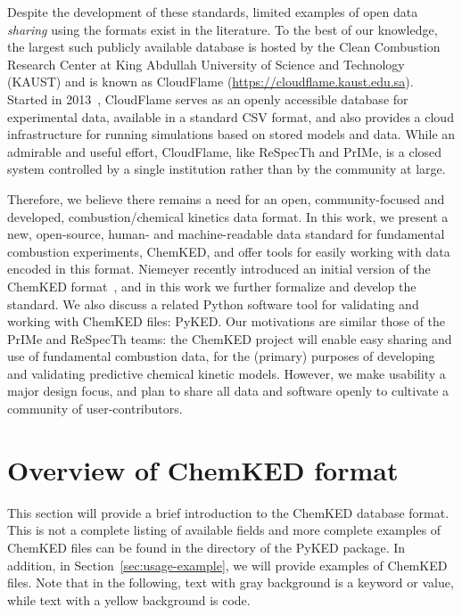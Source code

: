\documentclass[12pt]{ussci}
\newcommand\ck{ChemKED}
\newcommand\pk{PyKED}
\begin{document}
Despite the development of these standards, limited examples of open data
\emph{sharing} using the formats exist in the literature. To the best
of our knowledge, the largest such publicly available database is hosted by
the Clean Combustion Research Center at King Abdullah University of Science and
Technology (KAUST) and is known as CloudFlame
(\url{https://cloudflame.kaust.edu.sa}). Started in
2013~\autocite{Goteng:2013cf}, CloudFlame serves
as an openly accessible database for experimental data, available in a standard
CSV format, and also provides a cloud infrastructure for running simulations
based on stored models and data. While an admirable and useful effort,
CloudFlame, like ReSpecTh and PrIMe, is a closed system controlled by a single
institution rather than by the community at large.

Therefore, we believe there remains a need for an open, community-focused and
developed, combustion\slash chemical kinetics data format. In this work, we
present a new, open-source, human- and machine-readable data standard for
fundamental combustion experiments, \ck{}, and offer tools for easily working
with data encoded in this format. Niemeyer recently introduced an initial
version of the \ck{} format~\autocite{Niemeyer:2016wf}, and in this work we
further formalize and develop the standard. We also discuss a related Python
software tool for validating and working with \ck{} files: \pk{}. Our
motivations are similar those of the PrIMe and ReSpecTh teams: the \ck{} project
will enable easy sharing and use of fundamental combustion data, for the
(primary) purposes of developing and validating predictive chemical kinetic
models. However, we make usability a major design focus, and plan to share all
data and software openly to cultivate a community of user-contributors.

\section{Overview of ChemKED format}\label{sec:overview-of-format}

This section will provide a brief introduction to the \ck{} database format.
This is not a complete listing of available fields and more complete examples of
\ck{} files can be found in the  directory of the \pk{} package. In
addition, in Section~\ref{sec:usage-example}, we will provide examples of \ck{}
files. Note that in the following, text with gray background is a 
keyword or value, while text with a yellow background is  code.
\end{document}
